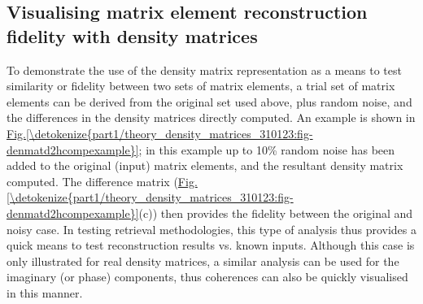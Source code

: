 \documentclass[letterpaper,table,10pt,english]{jupyterBook}
\begin{document}
\subsection{Visualising matrix element reconstruction fidelity with density matrices}
\label{\detokenize{part1/theory_density_matrices_310123:visualising-matrix-element-reconstruction-fidelity-with-density-matrices}}
\sphinxAtStartPar
To demonstrate the use of the density matrix representation as a means to test similarity or fidelity between two sets of matrix elements, a trial set of matrix elements can be derived from the original set used above, plus random noise, and the differences in the density matrices directly computed. An example is shown in \hyperref[\detokenize{part1/theory_density_matrices_310123:fig-denmatd2hcompexample}]{Fig.\@ \ref{\detokenize{part1/theory_density_matrices_310123:fig-denmatd2hcompexample}}}; in this example up to 10\% random noise has been added to the original (input) matrix elements, and the resultant density matrix computed. The difference matrix (\hyperref[\detokenize{part1/theory_density_matrices_310123:fig-denmatd2hcompexample}]{Fig.\@ \ref{\detokenize{part1/theory_density_matrices_310123:fig-denmatd2hcompexample}}}(c)) then provides the fidelity between the original and noisy case. In testing retrieval methodologies, this type of analysis thus provides a quick means to test reconstruction results vs. known inputs. Although this case is only illustrated for real density matrices, a similar analysis can be used for the imaginary (or phase) components, thus coherences can also be quickly visualised in this manner.
\end{document}
